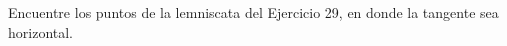 \setcounter{enumi}{30}
\item Encuentre los puntos de la lemniscata del Ejercicio 29, en donde la tangente sea horizontal.
